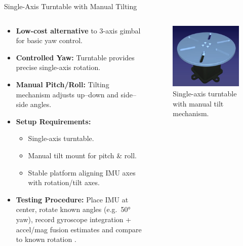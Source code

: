 \documentclass[aspectratio=169,xcolor=dvipsnames]{beamer}
\begin{document}
\begin{frame}{Single-Axis Turntable with Manual Tilting}
\scriptsize
\begin{columns}[T]
  \begin{column}{0.5\textwidth}
    \begin{itemize}
      \item \textbf{Low-cost alternative} to 3-axis gimbal for basic yaw control.
      \item \textbf{Controlled Yaw:} Turntable provides precise single-axis rotation.
      \item \textbf{Manual Pitch/Roll:} Tilting mechanism adjusts up–down and side–side angles.
      \item \textbf{Setup Requirements:}
        \begin{itemize}
          \item Single-axis turntable.
          \item Manual tilt mount for pitch & roll.
          \item Stable platform aligning IMU axes with rotation/tilt axes.
        \end{itemize}
      \item \textbf{Testing Procedure:}
        Place IMU at center, rotate known angles (e.g.\ 50° yaw), record gyroscope integration + accel/mag fusion estimates and compare to known rotation \cite{angle_sar}.
    \end{itemize}
  \end{column}
  
  \begin{column}{0.4\textwidth}
    \begin{figure}
      \centering
      \includegraphics[width=\linewidth]{logos/Turntable.png}
      \caption{Single-axis turntable with manual tilt mechanism.}
      \label{fig:turntable_setup}
    \end{figure}
  \end{column}
\end{columns}
\end{frame}
\end{document}
